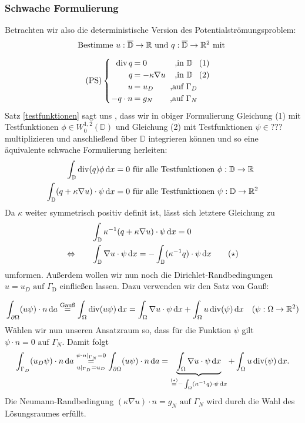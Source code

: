 \subsubsection{Schwache Formulierung}
Betrachten wir also die deterministische Version des Potentialströmungsproblem:
\[ \text{Bestimme } u:\overline{\mathbb{D}} \to \R \text{ und } q: \overline{\mathbb{D}} \to \R^2 \text{ mit } \newline \]
\[\setlength\arraycolsep{1pt}
\text{(PS)}\begin{cases} 
\begin{array}{rlcr}
\dive q     &= 0                 &\text{ ,} \text{in } \mathbb{D} &(1)\\
q           &= - \kappa \nabla u &\text{ ,} \text{in }\mathbb{D} &(2)\\
u           &= u_D               &\text{ ,} \text{auf } \Gamma_D \\
-q \cdot n  &= g_N               &\text{ ,} \text{auf } \Gamma_N 
\end{array}
\end{cases} 
\]
Satz \ref{testfunktionen} sagt uns , dass wir in obiger Formulierung Gleichung (1) mit Testfunktionen $\phi \in W_0^{1,2}(\mathbb{D})$ und Gleichung (2) mit Testfunktionen $\psi \in ??? $ multiplizieren und anschließend über $\mathbb{D}$ integrieren können und so eine äquivalente schwache Formulierung herleiten:
\begin{align*}
	\int_{\mathbb{D}} \operatorname{div}(q) \phi \, \mathrm{d} x &= 0 \text{ für alle Testfunktionen } \phi : \mathbb{D} \to \mathbb{R} \\
	\int_{\mathbb{D}} (q + \kappa \nabla u) \cdot \psi \, \mathrm{d} x &= 0 \text{ für alle Testfunktionen } \psi : \mathbb{D} \to \mathbb{R}^2
\end{align*}
Da $\kappa$ weiter symmetrisch positiv definit ist, lässt sich letztere Gleichung zu 
\begin{align*}
	&\int_{\mathbb{D}} \kappa^{-1} (q + \kappa \nabla u) \cdot \psi \, \mathrm{d} x = 0 \\
	\Leftrightarrow \qquad &\int_{\mathbb{D}} \nabla u \cdot \psi \, \mathrm{d} x = - \int_{\mathbb{D}} (\kappa^{-1}q)\cdot \psi \, \mathrm{d} x \qquad (\star) 
\end{align*}
umformen. Außerdem wollen wir nun noch die Dirichlet-Randbedingungen $u = u_D \text{ auf } \Gamma_{\text{D}}$ einfließen lassen. Dazu verwenden wir den Satz von Gauß:


\[ \int_{\partial\Omega} (u\psi) \cdot n \, \mathrm{d} a \stackrel{\text{Gauß}}{=} 
 \int_{\Omega} \operatorname{div}(u\psi) \, \mathrm{d} x = \int_{\Omega} \nabla u \cdot \psi \, \mathrm{d} x + \int_{\Omega} u \operatorname{div}(\psi) \, \mathrm{d} x \quad (\psi:\Omega \to \mathbb{R}^2) \]
Wählen wir nun unseren Ansatzraum so, dass  für die Funktion $ \psi$ gilt $ \psi \cdot n = 0 \text{ auf } \Gamma_N $. Damit folgt
\begin{align*}
\int_{\Gamma_D} (u_D\psi) \cdot n \, \mathrm{d} a \overset{\psi \cdot n|_{\Gamma_N} = 0}{\underset{u |_{\Gamma_D} = u_D} {=}} \int_{\partial\Omega} (u\psi) \cdot n \, \mathrm{d} a = \underbrace{\int_{\Omega} \nabla u \cdot \psi \, \mathrm{d} x}_{\stackrel{(\star)}{=}- \int_{\Omega} (\kappa^{-1} q) \cdot \psi \, \mathrm{d} x } + \int_{\Omega} u \operatorname{div}(\psi) \, \mathrm{d} x.
\end{align*}
Die Neumann-Randbedingung $ (\kappa\nabla u) \cdot n = g_N \text{ auf } \Gamma_N $ wird durch die Wahl des Lösungsraumes erfüllt.


